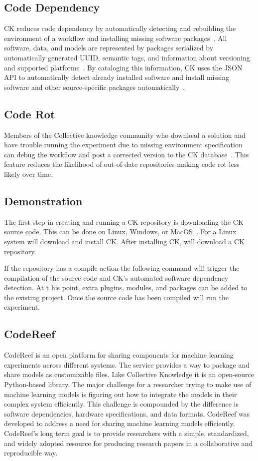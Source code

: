 \documentclass{IEEEtran}
\begin{document}
\subsection{Code Dependency}
CK reduces code dependency by automatically detecting and rebuilding the environment of a workflow and installing missing software packages~\cite{ctuning/feat}. All software, data, and models are represented by packages serialized by automatically generated UUID, semantic tags, and information about versioning and supported platforms~\cite{ctuning/feat}. By cataloging this information, CK uses the JSON API to automatically detect already installed software and install missing software and other source-specific packages automatically~\cite{ctuningPW}. 

\subsection{Code Rot}
Members of the Collective knowledge community who download a solution and have trouble running the experiment due to missing environment specification can debug the workflow and post a corrected version to the CK database~\cite{aboutCK}. This feature reduces the likelihood of out-of-date repositories making code rot less likely over time. 

\subsection{Demonstration}
The first step in creating and running a CK repository is downloading the CK source code. This can be done on Linux, Windows, or MacOS~\cite{DPCK}. For a Linux system  will download and install CK.
After installing CK,  will download a CK repository.

If the repository has a compile action the following command will trigger the compilation of the source code and CK’s automated software dependency detection. At t his point, extra plugins, modules, and packages can be added to the existing project. Once the source code has been compiled  will run the experiment.

\subsection{CodeReef}
CodeReef is an open platform for sharing components for machine learning experiments across different systems. The service provides a way to package and share models as customizable files. Like Collective Knowledge it is an open-source Python-based library.
The major challenge for a researcher trying to make use of machine learning models is figuring out how to integrate the models in their complex system efficiently. This challenge is compounded by the difference is software dependencies, hardware specifications, and data formats. CodeReef was developed to address a need for sharing machine learning models efficiently. 
CodeReef’s long term goal is to provide researchers with a simple, standardized, and widely adopted resource for producing research papers in a collaborative and reproducible way. 
\end{document}
